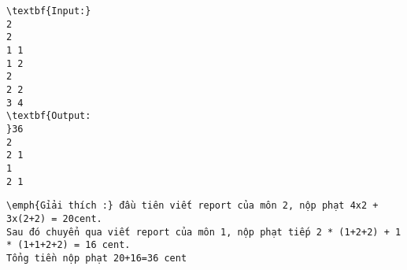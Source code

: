 \begin{verbatim}
\textbf{Input:}
2
2
1 1
1 2
2
2 2
3 4
\textbf{Output:
}36
2
2 1
1
2 1\end{verbatim}
\begin{verbatim}
\emph{Gỉải thích :} đầu tiên viết report của môn 2, nộp phạt 4x2 + 3x(2+2) = 20cent.
Sau đó chuyển qua viết report của môn 1, nộp phạt tiếp 2 * (1+2+2) + 1 * (1+1+2+2) = 16 cent. 
Tổng tiền nộp phạt 20+16=36 cent
\end{verbatim}